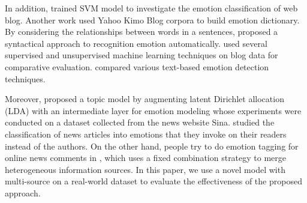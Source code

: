 \documentclass{IEEEtran}
\begin{document}
In addition, \citet{yang2007emotion} trained SVM model to investigate the emotion classification of web blog. Another work \citet{yang2007building} used Yahoo Kimo Blog corpora to build emotion dictionary. By considering the relationships between words in a sentences, \citet{neviarouskaya2007narrowing} proposed a syntactical approach to recognition emotion automatically. \citet{mishne2006capturing} used several supervised and unsupervised machine learning techniques on blog data for comparative evaluation. \citet{binali2012emotion} compared various text-based emotion detection techniques.


Moreover,\citet{bao2009joint, bao2011mining} proposed a topic model by augmenting latent Dirichlet allocation (LDA) with an intermediate layer for emotion modeling whose experiments were conducted on a dataset collected from the news website Sina. \citet{lin2007emotions, lin2008emotion} studied the classification of news articles into emotions that they invoke on their readers instead of the authors.
On the other hand, people try to do emotion tagging for online news comments in \citet{zhang2012emotion, ZhangZSLWY14}, which uses a fixed combination strategy to merge heterogeneous information sources. In this paper, we use a novel model with multi-source on a real-world dataset to evaluate the effectiveness of the proposed approach.
\end{document}
